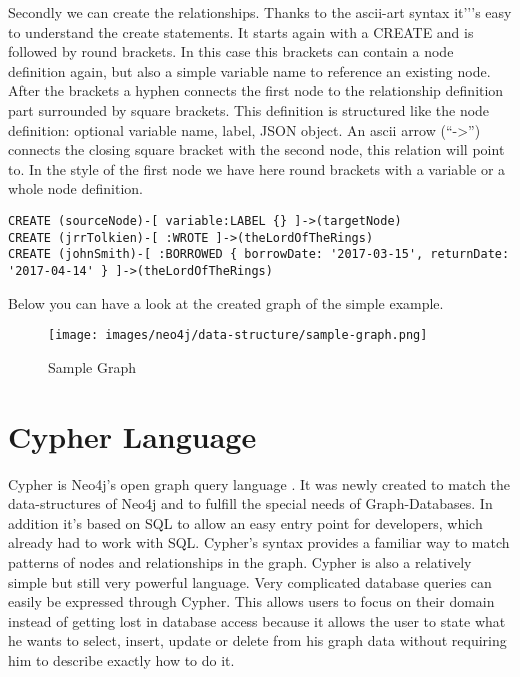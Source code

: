 Secondly we can create the relationships. Thanks to the ascii-art syntax it'’'s easy to understand the create statements. It starts again with a CREATE and is followed by round brackets. In this case this brackets can contain a node definition again, but also a simple variable name to reference an existing node. After the brackets a hyphen connects the first node to the relationship definition part surrounded by square brackets. This definition is structured like the node definition: optional variable name, label, JSON object. An ascii arrow (“->”) connects the closing square bracket with the second node, this relation will point to. In the style of the first node we have here round brackets with a variable or a  whole node definition.
\cite["Create a Record for Yourself", para. 1]{NeoTechnologyInc.2017d} \cite[p. 81-82]{Gupta.2015}

\begin{lstlisting}[frame=single, caption=Create Relationships, label=creategraphrelationships]
CREATE (sourceNode)-[ variable:LABEL {} ]->(targetNode)
CREATE (jrrTolkien)-[ :WROTE ]->(theLordOfTheRings)
CREATE (johnSmith)-[ :BORROWED { borrowDate: '2017-03-15', returnDate: '2017-04-14' } ]->(theLordOfTheRings)
\end{lstlisting}

Below you can have a look at the created graph of the simple example.

\begin{figure}[H]
	\texttt{[image: images/neo4j/data-structure/sample-graph.png]}
	\caption{Sample Graph}
\end{figure}

\section{Cypher Language}

Cypher is Neo4j's open graph query language \cite["Cypher Query Language", para. 1]{NeoTechnologyInc.2017e}. It was newly created to match the data-structures of Neo4j and to fulfill the special needs of Graph-Databases.
In addition it's based on SQL to allow an easy entry point for developers, which already had to work with SQL. \cite["About Cypher", para. 1]{NeoTechnologyInc.2017d}
Cypher's syntax provides a familiar way to match patterns of nodes and relationships in the graph.
Cypher is also a relatively simple but still very powerful language. \cite["Fazit", para. 1]{Mahler.2014}
Very complicated database queries can easily be expressed through Cypher.
This allows users to focus on their domain instead of getting lost in database access because it allows the user to state what he wants to select, insert, update or delete from his graph data without requiring him to describe exactly how to do it.

